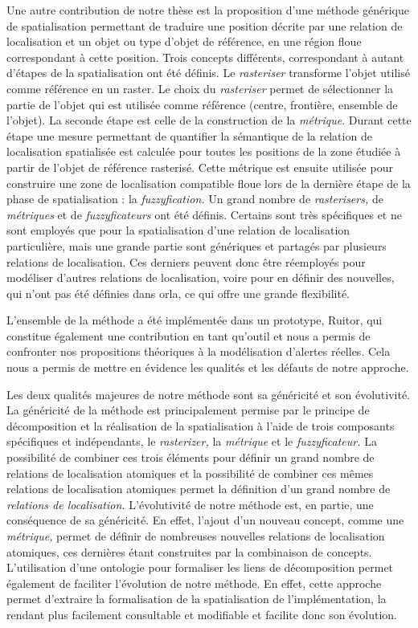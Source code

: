 Une autre contribution de notre thèse est la proposition d'une méthode
générique de spatialisation permettant de traduire une position
décrite par une relation de localisation et un objet ou type d'objet
de référence, en une région floue correspondant à cette position.
Trois concepts différents, correspondant à autant d'étapes de la
spatialisation ont été définis. Le \emph{rasteriser} transforme
l'objet utilisé comme référence en un raster. Le choix du
\emph{rasteriser} permet de sélectionner la partie de l'objet qui est
utilisée comme référence (centre, frontière, ensemble de l'objet). La
seconde étape est celle de la construction de la
\emph{métrique}. Durant cette étape une mesure permettant de
quantifier la sémantique de la relation de localisation spatialisée
est calculée pour toutes les positions de la zone étudiée à partir de
l'objet de référence rasterisé. Cette métrique est ensuite utilisée
pour construire une zone de localisation compatible floue lors de la
dernière étape de la phase de spatialisation : la
\emph{fuzzyfication.}  Un grand nombre de \emph{rasterisers,} de
\emph{métriques} et de \emph{fuzzyficateurs} ont été définis. Certains
sont très spécifiques et ne sont employés que pour la spatialisation
d'une relation de localisation particulière, mais une grande partie
sont génériques et partagés par plusieurs relations de
localisation. Ces derniers peuvent donc être réemployés pour modéliser
d'autres relations de localisation, voire pour en définir des
nouvelles, qui n'ont pas été définies dans \ac{orla}, ce qui offre une
grande flexibilité.

L'ensemble de la méthode a été implémentée dans un prototype, Ruitor,
qui constitue également une contribution en tant qu'outil et nous a
permis de confronter nos propositions théoriques à la modélisation
d'alertes réelles. Cela nous a permis de mettre en évidence les
qualités et les défauts de notre approche.

Les deux qualités majeures de notre méthode sont sa généricité et son
évolutivité. La généricité de la méthode est principalement permise
par le principe de décomposition et la réalisation de la
spatialisation à l'aide de trois composants spécifiques et
indépendants, le \emph{rasterizer,} la \emph{métrique} et le
\emph{fuzzyficateur.} La possibilité de combiner ces trois éléments
pour définir un grand nombre de relations de localisation atomiques et
la possibilité de combiner ces mêmes relations de localisation
atomiques permet la définition d'un grand nombre de \emph{relations de
  localisation.} L'évolutivité de notre méthode est, en partie, une
conséquence de sa généricité. En effet, l'ajout d'un nouveau concept,
comme une \emph{métrique,} permet de définir de nombreuses nouvelles
relations de localisation atomiques, ces dernières étant construites
par la combinaison de concepts. L'utilisation d'une ontologie pour
formaliser les liens de décomposition permet également de faciliter
l'évolution de notre méthode. En effet, cette approche permet
d'extraire la formalisation de la spatialisation de l'implémentation,
la rendant plus facilement consultable et modifiable et facilite donc
son évolution.

